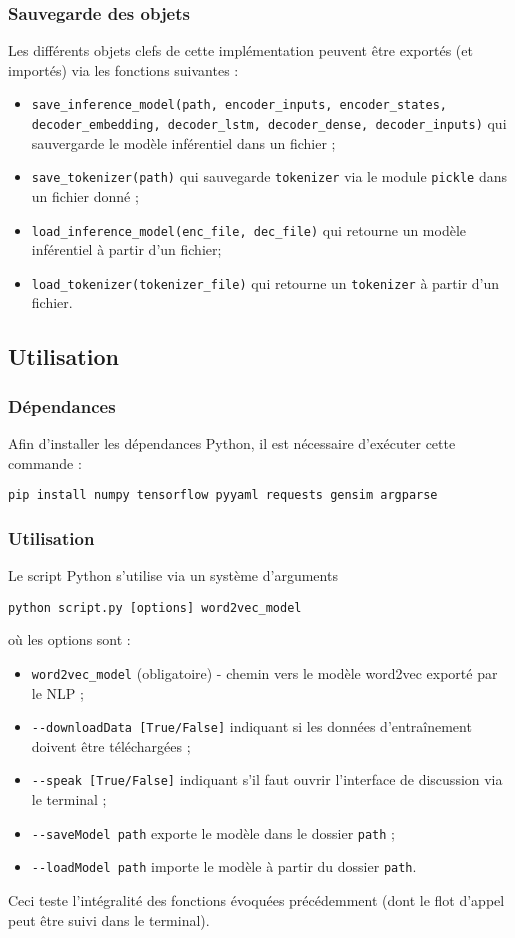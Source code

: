 \documentclass[10pt,a4paper]{article}
\begin{document}
\subsubsection{Sauvegarde des objets}
Les différents objets clefs de cette implémentation peuvent être exportés (et importés) via les fonctions suivantes :
\begin{itemize}
\item \texttt{save\_inference\_model(path, encoder\_inputs, encoder\_states, decoder\_embedding, decoder\_lstm, decoder\_dense, decoder\_inputs)} qui sauvergarde le modèle inférentiel dans un fichier ;
\item \texttt{save\_tokenizer(path)} qui sauvegarde \texttt{tokenizer} via le module \texttt{pickle} dans un fichier donné ;
\item \texttt{load\_inference\_model(enc\_file, dec\_file)} qui retourne un modèle inférentiel à partir d'un fichier;
\item \texttt{load\_tokenizer(tokenizer\_file)} qui retourne un \texttt{tokenizer} à partir d'un fichier.
\end{itemize}

\subsection{Utilisation}
\subsubsection{Dépendances}

Afin d'installer les dépendances Python, il est nécessaire d’exécuter cette commande :
\begin{center}
\texttt{pip install numpy tensorflow pyyaml requests gensim argparse}
\end{center}
\subsubsection{Utilisation}
Le script Python s'utilise via un système d'arguments
\begin{center}
\texttt{python script.py [options] word2vec\_model}
\end{center}
où les options sont :
\begin{itemize}
\item \texttt{word2vec\_model} (obligatoire) - chemin vers le modèle word2vec exporté par le NLP ;
\item \texttt{-{}-downloadData [True/False]} indiquant si les données d'entraînement doivent être téléchargées ;
\item \texttt{-{}-speak [True/False]} indiquant s'il faut ouvrir l'interface de discussion via le terminal ;
\item \texttt{-{}-saveModel path} exporte le modèle dans le dossier \texttt{path} ;
\item \texttt{-{}-loadModel path} importe le modèle à partir du dossier \texttt{path}.
\end{itemize}
Ceci teste l'intégralité des fonctions évoquées précédemment (dont le flot d'appel peut être suivi dans le terminal). 
\end{document}
